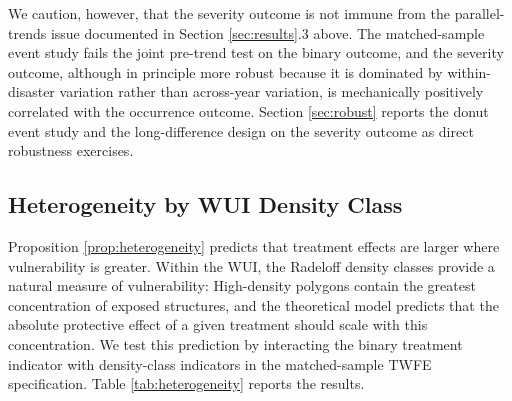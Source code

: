 \documentclass[12pt, letterpaper]{article}
\begin{document}
We caution, however, that the severity outcome is not immune from the parallel-trends issue documented in Section \ref{sec:results}.3 above. The matched-sample event study fails the joint pre-trend test on the binary outcome, and the severity outcome, although in principle more robust because it is dominated by within-disaster variation rather than across-year variation, is mechanically positively correlated with the occurrence outcome. Section \ref{sec:robust} reports the donut event study and the long-difference design on the severity outcome as direct robustness exercises.

\subsection{Heterogeneity by WUI Density Class}

Proposition \ref{prop:heterogeneity} predicts that treatment effects are larger where vulnerability is greater. Within the WUI, the Radeloff density classes provide a natural measure of vulnerability: High-density polygons contain the greatest concentration of exposed structures, and the theoretical model predicts that the absolute protective effect of a given treatment should scale with this concentration. We test this prediction by interacting the binary treatment indicator with density-class indicators in the matched-sample TWFE specification. Table \ref{tab:heterogeneity} reports the results.
\end{document}
